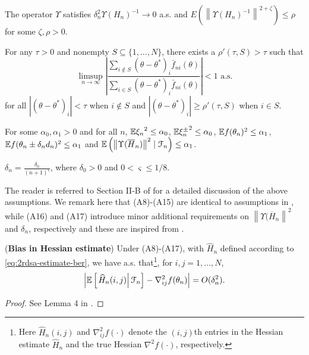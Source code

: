 \begin{pvn}
\item The operator $\Upsilon$ satisfies $\delta_n^2 \Upsilon(H_n)^{-1} \rightarrow 0$ a.s. and  $E(\left\| \Upsilon(H_n)^{-1}\right\|^{2+\zeta}) \le \rho$ for some $\zeta, \rho>0$.

\item For any $\tau >0$ and nonempty $S \subseteq \{1,\ldots,N\}$, there exists a $\rho'(\tau,S)>\tau$ such that 
$$ \limsup_{n\rightarrow \infty} \left| \dfrac{\sum_{i \notin S} (\theta-\theta^*)_i \bar f_{ni}(\theta)}{\sum_{i \in S} (\theta-\theta^*)_i \bar f_{ni}(\theta)}               \right| < 1 \text{ a.s.}$$
for all $|(\theta-\theta^*)_i| < \tau$ when $i \notin S$ and $|(\theta-\theta^*)_i| \ge \rho'(\tau,S)$ when $i\in S$.
\item For some $\alpha_0, \alpha_1>0$ and for all $n$, $\mathbb{E} {\xi_n}^{2} \le \alpha_0$, $\mathbb{E} {\xi_n^{\pm}}^{2} \le \alpha_0$, $\mathbb{E} f(\theta_n)^{2} \le \alpha_1$,  $\mathbb{E} f(\theta_n\pm \delta_n d_n)^{2} \le \alpha_1$ and $\mathbb{E} \left(\left\| \Upsilon(\overline H_n) \right\|^2 \mid \mathcal{F}_n\right) \le \alpha_1$. 
\item  $\delta_n = \frac{\delta_0}{(n+1)^{\varsigma}}$, where $\delta_0 > 0$ and $0 < \varsigma \le 1/8$.
\end{pvn}
The reader is referred to Section II-B of \cite{prashanth2015rdsa} for a detailed discussion of the above assumptions. We remark here that (A8)-(A15) are identical to assumptions in \cite{prashanth2015rdsa}, while (A16) and (A17) introduce minor additional requirements on $\left\| \Upsilon(\overline H_n \right\|^2$ and $\delta_n$, respectively and these are inspired from \cite{spall-jacobian}.

\begin{lemma}(\textbf{Bias in Hessian estimate})
\label{lemma:2rdsa-bias}
Under (A8)-(A17), with $\widehat H_n$ defined according to \eqref{eq:2rdsa-estimate-ber}, we have a.s. that\footnote{Here $\widehat H_n(i,j)$ and $\nabla^2_{ij}f(\cdot)$ denote the $(i,j)$th entries in the Hessian estimate $\widehat H_n$ and the true Hessian $\nabla^2 f(\cdot)$, respectively.}, for $i,j = 1,\ldots,N$,
\begin{align}
\left|\mathbb{E}\left[
\left. \widehat H_n(i,j) \right| \mathcal{F}_n \right] - \nabla^2_{ij} f(\theta_n)\right| = O(\delta_n^2).
\end{align} 
\end{lemma}
\begin{proof}
See Lemma 4 in \cite{prashanth2015rdsa}.
\end{proof}

